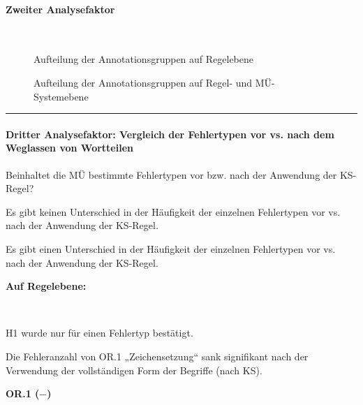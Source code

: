 \paragraph*{Zweiter Analysefaktor}\hfill\\
\begin{figure}[H]
\caption{Aufteilung der Annotationsgruppen auf Regelebene}
\end{figure}
\begin{figure}[H]
\caption{Aufteilung der Annotationsgruppen auf Regel- und MÜ-Systemebene}
\end{figure}
\hrule
\paragraph*{Dritter Analysefaktor: Vergleich der Fehlertypen vor vs. nach dem Weglassen von Wortteilen}
\begin{description}[font=\normalfont\bfseries]
\item [Fragestellung:] Beinhaltet die MÜ bestimmte Fehlertypen vor bzw. nach der Anwendung der KS-Regel?
\item [H0 --] Es gibt keinen Unterschied in der Häufigkeit der einzelnen Fehlertypen vor vs. nach der Anwendung der KS-Regel.
\item [H1 --] Es gibt einen Unterschied in der Häufigkeit der einzelnen Fehlertypen vor vs. nach der Anwendung der KS-Regel.
\item [Resultat]
\end{description}
\noindent
\parbox[t]{.8\textwidth}{\textbf{Auf Regelebene:}}\\
\parbox[t]{.8\textwidth}{
H1 wurde nur für einen Fehlertyp bestätigt.

Die Fehleranzahl von OR.1 „Zeichensetzung“ sank signifikant nach der Verwendung der vollständigen Form der Begriffe (nach KS).
}
\parbox[t]{.04\textwidth}{}
\colorbox{smGreen}{\parbox[t]{.15\textwidth}{
\textbf{OR.1 ($-$)}\\
\\
\\
}}

